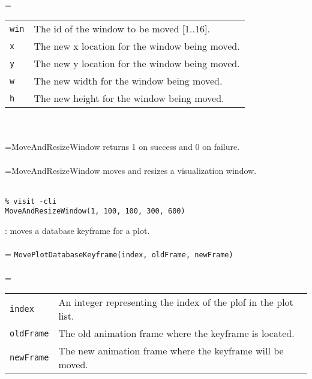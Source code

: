 \documentclass[10pt,a4paper]{report}
\begin{document}
 \\ 
\hangindent=\parindent 
\begin{tabular}{lp{9cm}}
\verb!win! & The id of the window to be moved [1..16]. \\
\verb!x! & The new x location for the window being moved. \\
\verb!y! & The new y location for the window being moved. \\
\verb!w! & The new width for the window being moved. \\
\verb!h! & The new height for the window being moved. \\
\end{tabular} \\[-2mm]


 \\ 
\hangindent=\parindent MoveAndResizeWindow returns 1 on success and 0 on failure. \\[-3mm] 

 \\ 
\hangindent=\parindent MoveAndResizeWindow moves and resizes a visualization window. \\[-3mm] 

\\[-6mm]
\begin{verbatim}% visit -cli
MoveAndResizeWindow(1, 100, 100, 300, 600)
\end{verbatim}
\newpage


{}
: moves a database keyframe for a plot.\\[-3mm]

 \\ 
\hangindent=\parindent 
\verb!MovePlotDatabaseKeyframe(index, oldFrame, newFrame)!\\ [-3mm]

 \\ 
\hangindent=\parindent 
\begin{tabular}{lp{9cm}}
\verb!index! & An integer representing the index of the plof in the plot list. \\
\verb!oldFrame! & The old animation frame where the keyframe is located. \\
\verb!newFrame! & The new animation frame where the keyframe will be moved. \\
\end{tabular} \\[-2mm]
\end{document}
